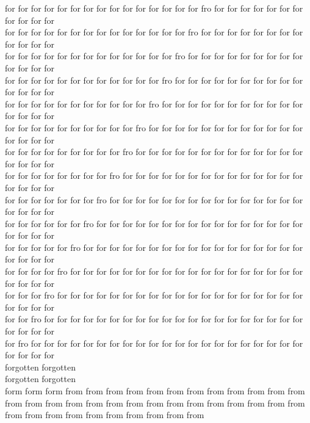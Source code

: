 for for for for for for for for for for for for for for for fro for for for for for for for for for for for\\
for for for for for for for for for for for for for for fro for for for for for for for for for for for for\\
for for for for for for for for for for for for for fro for for for for for for for for for for for for for\\
for for for for for for for for for for for for fro for for for for for for for for for for for for for for\\
for for for for for for for for for for for fro for for for for for for for for for for for for for for for\\
for for for for for for for for for for fro for for for for for for for for for for for for for for for for\\
for for for for for for for for for fro for for for for for for for for for for for for for for for for for\\
for for for for for for for for fro for for for for for for for for for for for for for for for for for for\\
for for for for for for for fro for for for for for for for for for for for for for for for for for for for\\
for for for for for for fro for for for for for for for for for for for for for for for for for for for for\\
for for for for for fro for for for for for for for for for for for for for for for for for for for for for\\
for for for for fro for for for for for for for for for for for for for for for for for for for for for for\\
for for for fro for for for for for for for for for for for for for for for for for for for for for for for\\
for for fro for for for for for for for for for for for for for for for for for for for for for for for for\\
for fro for for for for for for for for for for for for for for for for for for for for for for for for for\\
forgotten forgotten\\
forgotten forgotten\\
form form form from from from from from from from from from from from from from from from from from from from from from from from from from from from from from from from from from from from from from\\
